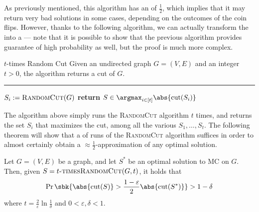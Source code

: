 \documentclass[a4paper, 12pt]{report}
\begin{document}
    As previously mentioned, this algorithm has an  of $\frac{1}{2}$, which implies that it may return very bad solutions in some cases, depending on the outcomes of the coin flips. However, thanks to the following algorithm, we can actually transform the  into a  --- note that it is possible to show that the previous algorithm provides guarantee of high probability as well, but the proof is much more complex.

    \begin{framedalgo}{$t$-times Random Cut}
        Given an undirected graph $G = (V, E)$ and an integer $t > 0$, the algorithm returns a cut of $G$. \\
        \hrule

        \quad
        \begin{algorithmic}[1]
                    \State $S_i := \textsc{RandomCut}(G)$
                \EndFor
                \State \textbf{return} $S \in \argmax_{i \in [t]}{\abs{\mathrm{cut}(S_i)}}$
            \EndFunction
        \end{algorithmic}
    \end{framedalgo}

    The algorithm above simply runs the \textsc{RandomCut} algorithm $t$ times, and returns the set $S_i$ that maximizes the cut, among all the various $S_1, \ldots, S_t$. The following theorem will show that a  of runs of the \textsc{RandomCut} algorithm suffices in order to almost certainly obtain a $\approx \frac{1}{2}$-approximation of any optimal solution.

    \begin{framedthm}{}
        Let $G= (V, E)$ be a graph, and let $S^*$ be an optimal solution to MC on $G$. Then, given $S = \textsc{$t$-timesRandomCut}(G, t)$, it holds that $$\Pr \sbk{\abs{\mathrm{cut}(S)} > \dfrac{1 - \varepsilon}{2} \abs{\mathrm{cut}(S^*)}} > 1 - \delta$$ where $t = \frac{2}{\varepsilon} \ln {\frac{1}{\delta}}$ and $0 < \varepsilon, \delta < 1$.
    \end{framedthm}
    
\end{document}

